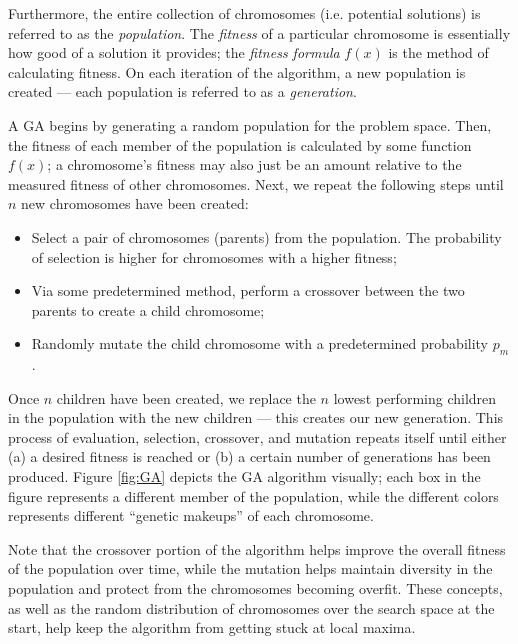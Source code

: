 Furthermore, the entire collection of chromosomes (i.e. potential solutions) is referred to as the \textit{population}.  The \textit{fitness} of a particular chromosome is essentially how good of a solution it provides; the \textit{fitness formula} $f(x)$ is the method of calculating fitness.  On each iteration of the algorithm, a new population is created --- each population is referred to as a \textit{generation}.

A GA begins by generating a random population for the problem space.  Then, the fitness of each member of the population is calculated by some function $f(x)$; a chromosome's fitness may also just be an amount relative to the measured fitness of other chromosomes.  Next, we repeat the following steps until $n$ new chromosomes have been created:
\begin{itemize}
\item Select a pair of chromosomes (parents) from the population.  The probability of selection is higher for chromosomes with a higher fitness;
\item Via some predetermined method, perform a crossover between the two parents to create a child chromosome;
\item Randomly mutate the child chromosome with a predetermined probability $p_m$.
\end{itemize}

Once $n$ children have been created, we replace the $n$ lowest performing children in the population with the new children --- this creates our new generation.  This process of evaluation, selection, crossover, and mutation repeats itself until either (a) a desired fitness is reached or (b) a certain number of generations has been produced.  Figure \ref{fig:GA} depicts the GA algorithm visually; each box in the figure represents a different member of the population, while the different colors represents different ``genetic makeups'' of each chromosome.

Note that the crossover portion of the algorithm helps improve the overall fitness of the population over time, while the mutation helps maintain diversity in the population and protect from the chromosomes becoming overfit.  These concepts, as well as the random distribution of chromosomes over the search space  at the start, help keep the algorithm from getting stuck at local maxima.

